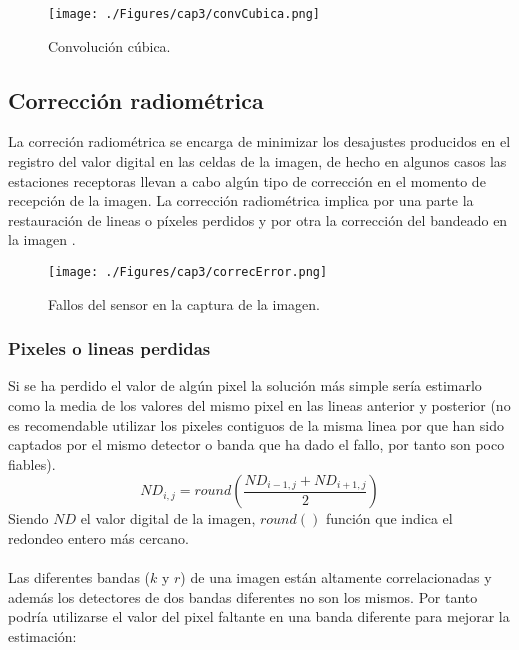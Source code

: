 \begin{itemize}
		    \begin{figure}[H]
		    	\centering
		    	\texttt{[image: ./Figures/cap3/convCubica.png]}
		    	\caption{Convoluci\'on c\'ubica.}
		    	\label{fig:convCubica}
		    \end{figure}
	\end{itemize}


\subsection{Correcci\'on radiom\'etrica}
La correci\'on radiom\'etrica se encarga de minimizar los desajustes producidos en el registro del valor digital en las celdas de la imagen, de hecho en algunos casos las estaciones receptoras llevan a cabo alg\'un tipo de correcci\'on en el momento de recepci\'on de la imagen. La corrección radiom\'etrica implica por una parte la restauraci\'on de lineas o p\'ixeles perdidos y por otra la correcci\'on del bandeado en la imagen \cite{teledUm}.
    \begin{figure}[H]
    	\centering
    	\texttt{[image: ./Figures/cap3/correcError.png]}
    	\caption{Fallos del sensor en la captura de la imagen.}
    	\label{fig:correcError}
    \end{figure}

\subsubsection{Pixeles o lineas perdidas}
Si se ha perdido el valor de alg\'un pixel la solución m\'as simple ser\'ia estimarlo como la media de los valores
del mismo pixel en las lineas anterior y posterior (no es recomendable utilizar los pixeles contiguos de la misma linea por que han sido captados por el mismo detector o banda que ha dado el fallo, por tanto son
poco fiables).
		\begin{equation}
		ND_{i,j} = round(\dfrac{ND_{i-1,j} + ND_{i+1,j}}{2})
		\end{equation} 
Siendo $ ND $ el valor digital de la imagen, $ round() $ funci\'on que indica el redondeo entero m\'as cercano.\\~\\
Las diferentes bandas ($ k $ y $ r $) de una imagen están altamente correlacionadas y adem\'as los detectores de dos bandas diferentes no son los mismos. Por tanto podría utilizarse el valor del pixel faltante en una banda diferente para mejorar la estimaci\'on:

